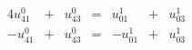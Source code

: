 \begin{alignat*}{4} 
	u_{41}^0 & {}+{} &  u_{43}^0 & {}={} & u_{01}^1 & {}+{} &  u_{03}^1\\
	-u_{41}^0 & {}+{} &  u_{43}^0 & {}={} & -u_{01}^1 & {}+{} &  u_{03}^1
\end{alignat*}